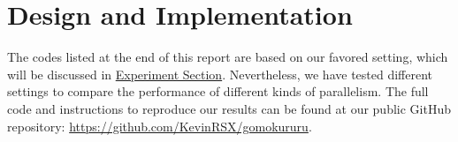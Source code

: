 \documentclass[twoside,11pt]{homework}
\begin{document}



\section{Design and Implementation}
The codes listed at the end of this report are based on our favored setting, which will be discussed in  \hyperref[experiment]{Experiment Section}. Nevertheless, we have tested different settings to compare the performance of different kinds of parallelism. The full code and instructions to reproduce our results can be found at our public GitHub repository: \url{https://github.com/KevinRSX/gomokururu}.
\end{document}
